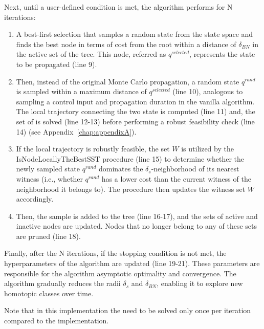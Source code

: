 Next, until a user-defined condition is met, the algorithm performs for N iterations:
\begin{enumerate}
    \item A best-first selection that samples a random state from the state space and finds the best node in terms of cost from the root within a distance of $\delta_{BN}$ in the active set of the tree. 
    This node, referred as $q^{selected}$, represents the state to be propagated (line 9).
    \item Then, instead of the original Monte Carlo propagation, a random state $q^{rand}$ is sampled within a maximum distance of $q^{selected}$ (line 10), analogous to sampling a control input and propagation duration in the vanilla algorithm.
    The local trajectory connecting the two state is computed (line 11) and, the set of  is solved (line 12-13) before performing a robust feasibility check (line 14) (see Appendix~\ref{chap:appendixA}).
    \item If the local trajectory is robustly feasible, the set $W$ is utilized by the IsNodeLocallyTheBestSST procedure (line 15) to determine whether the newly sampled state $q^{rand}$ dominates the $\delta_s$-neighborhood of its nearest witness (i.e., whether $q^{rand}$ has a lower cost than the current witness of the neighborhood it belongs to). 
    The procedure then updates the witness set $W$ accordingly.
    \item Then, the sample is added to the tree (line 16-17), and the sets of active and inactive nodes are updated.
    Nodes that no longer belong to any of these sets are pruned (line 18).
\end{enumerate}

Finally, after the N iterations, if the stopping condition is not met, the hyperparameters of the algorithm are updated (line 19-21).
These parameters are responsible for the algorithm asymptotic optimality and convergence. 
The algorithm gradually reduces the radii $\delta_s$ and $\delta_{BN}$, enabling it to explore new homotopic classes over time.

Note that in this implementation the  need to be solved only once per iteration compared to the  implementation.


